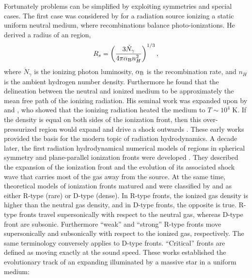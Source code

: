 \documentclass[apj,onecolumn]{emulateapj}
\begin{document}
Fortunately problems can be simplified by exploiting symmetries and
special cases.  The first case was considered by \citet{Stroemgren39}
for a radiation source ionizing a static uniform neutral medium, where
recombinations balance photo-ionizations.  He derived a radius of an
 region,
%
\begin{equation}
  \label{eqn:Rstr}
  R_s = \left(\frac{3\dot{N}_\gamma}{4\pi \alpha_{\rm B} n_H^2}\right)^{1/3},
\end{equation}
where $\dot{N}_\gamma$ is the ionizing photon luminosity, $\alpha_{\rm
  B}$ is the recombination rate, and $n_H$ is the ambient hydrogen
number density.  Furthermore he found that the delineation between the
neutral and ionized medium to be approximately the mean free path of
the ionizing radiation.  His seminal work was expanded upon by
\citet{Spitzer48, Spitzer49, Spitzer54} and \citet{Spitzer50}, who
showed that the ionizing radiation heated the medium to $T \sim 10^4$
K.  If the density is equal on both sides of the ionization front,
then this over-pressurized region would expand and drive a shock
outwards \citep[e.g.][]{Oort54, Schatzman55}.  These early works
provided the basis for the modern topic of radiation hydrodynamics.  A
decade later, the first radiation hydrodynamical numerical models of
 regions in spherical symmetry and plane-parallel ionization
fronts were developed \citep[e.g.][]{Mathews65, Lasker66,
  Hjellming66}.  They described the expansion of the ionization front
and the evolution of its associated shock wave that carries most of
the gas away from the source.  At the same time, theoretical models of
ionization fronts matured and were classified by \citet{Kahn54} and
\citet{Axford61} as either R-type (rare) or D-type (dense).  In R-type
fronts, the ionized gas density is higher than the neutral gas
density, and in D-type fronts, the opposite is true.  R-type fronts
travel supersonically with respect to the neutral gas, whereas D-type
front are subsonic.  Furthermore ``weak'' and ``strong'' R-type fronts
move supersonically and subsonically with respect to the ionized gas,
respectively.  The same terminology conversely applies to D-type
fronts.  ``Critical'' fronts are defined as moving exactly at the
sound speed.  These works established the evolutionary track of an
expanding  illuminated by a massive star in a uniform
medium:
%
\end{document}
